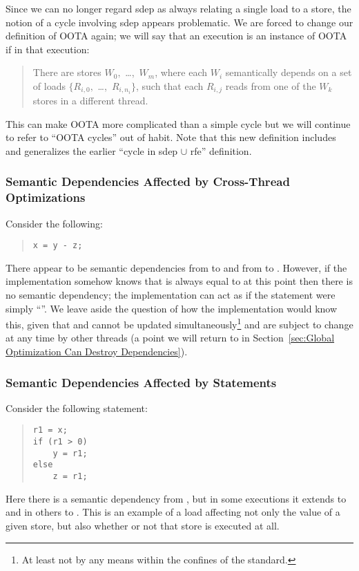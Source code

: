 Since we can no longer regard sdep as always relating a single load to a store,
the notion of a cycle involving sdep appears problematic.
We are forced to change our definition of OOTA again;
we will say that an execution is an instance of OOTA if in that execution:
\begin{quote}
	There are stores $W_0,$ \ldots,~$W_m$,
	where each $W_i$ semantically depends on a set of loads
	$\{R_{i,0},$ \ldots,~$R_{i,n_i}\}$,
	such that each $R_{i,j}$ reads from one of the $W_k$
	stores in a different thread.
\end{quote}
This can make OOTA more complicated than a simple cycle but
we will continue to refer to ``OOTA cycles'' out of habit.
Note that this new definition includes and generalizes the earlier
``cycle in sdep $\cup$ rfe'' definition.

\subsubsection{Semantic Dependencies Affected by Cross-Thread Optimizations}
\label{sec:Semantic Dependencies Affected by Cross-Thread Optimizations}

Consider the following:
\begin{quote}
\begin{verbatim}
x = y - z;
\end{verbatim}
\end{quote}
There appear to be semantic dependencies from  to  and from 
to .
However, if the implementation somehow knows that  is
always equal to  at this point then there is no semantic dependency;
the implementation can act as if the statement were simply ``''.
We leave aside the question of how the implementation would know this,
given that  and  cannot be updated simultaneously\footnote{
	At least not by any means within the confines of the standard.}
and are subject to change at any time by
other threads (a point we will return to in
Section~\ref{sec:Global Optimization Can Destroy Dependencies}).

\subsubsection{Semantic Dependencies Affected by  Statements}
\label{sec:Semantic Dependencies Affected by if Statements}

Consider the following  statement:
\begin{quote}
\begin{verbatim}
r1 = x;
if (r1 > 0)
    y = r1;
else
    z = r1;
\end{verbatim}
\end{quote}
Here there is a semantic dependency from , but in some executions
it extends to  and in others to .
This is an example of a load affecting not only the value of
a given store, but also whether or not that store is executed at all.

